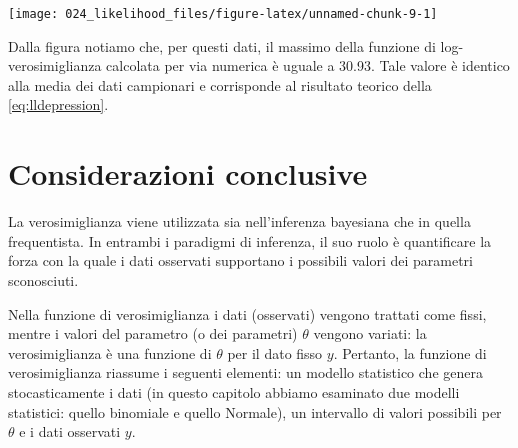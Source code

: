 \documentclass[
]{memoir}
\newenvironment{Shaded}{\begin{snugshade}}{\end{snugshade}}
\newcommand{\AttributeTok}[1]{\textcolor[rgb]{0.77,0.63,0.00}{#1}}
\newcommand{\FunctionTok}[1]{\textcolor[rgb]{0.00,0.00,0.00}{#1}}
\newcommand{\NormalTok}[1]{#1}
\newcommand{\SpecialCharTok}[1]{\textcolor[rgb]{0.00,0.00,0.00}{#1}}
\newcommand{\StringTok}[1]{\textcolor[rgb]{0.31,0.60,0.02}{#1}}
\theoremstyle{definition}
\theoremstyle{definition}
\theoremstyle{definition}
\theoremstyle{definition}
\theoremstyle{remark}
\begin{document}
\begin{Shaded}
\end{Shaded}

\begin{center}\texttt{[image: 024\_likelihood\_files/figure-latex/unnamed-chunk-9-1]} \end{center}

Dalla figura notiamo che, per questi dati, il massimo della funzione di log-verosimiglianza calcolata per via numerica è uguale a 30.93. Tale valore è identico alla media dei dati campionari e corrisponde al risultato teorico della \eqref{eq:lldepression}.

\hypertarget{considerazioni-conclusive}{%
\section*{Considerazioni conclusive}\label{considerazioni-conclusive}}

La verosimiglianza viene utilizzata sia nell'inferenza bayesiana che in quella frequentista. In entrambi i paradigmi di inferenza, il suo ruolo è quantificare la forza con la quale i dati osservati supportano i possibili valori dei parametri sconosciuti.

Nella funzione di verosimiglianza i dati (osservati) vengono trattati come fissi, mentre i valori del parametro (o dei parametri) \(\theta\) vengono variati: la verosimiglianza è una funzione di \(\theta\) per il dato fisso \(y\). Pertanto, la funzione di verosimiglianza riassume i seguenti elementi: un modello statistico che genera stocasticamente i dati (in questo capitolo abbiamo esaminato due modelli statistici: quello binomiale e quello Normale), un intervallo di valori possibili per \(\theta\) e i dati osservati \(y\).
\end{document}
